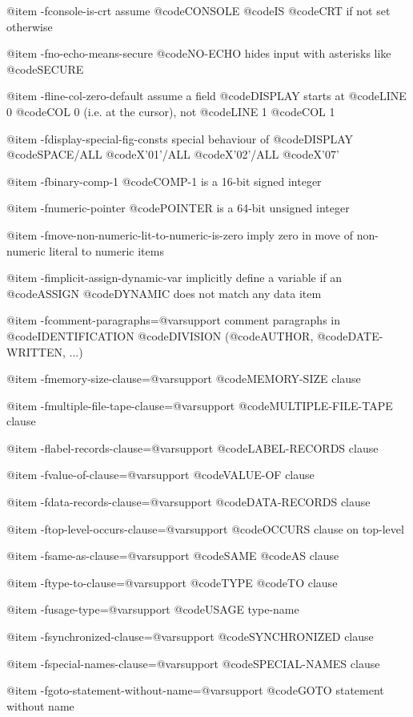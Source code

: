 @item -fconsole-is-crt
assume @code{CONSOLE} @code{IS} @code{CRT} if not set otherwise

@item -fno-echo-means-secure
@code{NO-ECHO} hides input with asterisks like @code{SECURE}

@item -fline-col-zero-default
assume a field @code{DISPLAY} starts at @code{LINE 0} @code{COL 0} (i.e. at the cursor), not @code{LINE 1} @code{COL 1}

@item -fdisplay-special-fig-consts
special behaviour of @code{DISPLAY} @code{SPACE/ALL} @code{X'01'/ALL} @code{X'02'/ALL} @code{X'07'}

@item -fbinary-comp-1
@code{COMP-1} is a 16-bit signed integer

@item -fnumeric-pointer
@code{POINTER} is a 64-bit unsigned integer

@item -fmove-non-numeric-lit-to-numeric-is-zero
imply zero in move of non-numeric literal to numeric items

@item -fimplicit-assign-dynamic-var
implicitly define a variable if an @code{ASSIGN} @code{DYNAMIC} does not match any data item

@item -fcomment-paragraphs=@var{support}
comment paragraphs in @code{IDENTIFICATION} @code{DIVISION} (@code{AUTHOR}, @code{DATE-WRITTEN}, ...)

@item -fmemory-size-clause=@var{support}
@code{MEMORY-SIZE} clause

@item -fmultiple-file-tape-clause=@var{support}
@code{MULTIPLE-FILE-TAPE} clause

@item -flabel-records-clause=@var{support}
@code{LABEL-RECORDS} clause

@item -fvalue-of-clause=@var{support}
@code{VALUE-OF} clause

@item -fdata-records-clause=@var{support}
@code{DATA-RECORDS} clause

@item -ftop-level-occurs-clause=@var{support}
@code{OCCURS} clause on top-level

@item -fsame-as-clause=@var{support}
@code{SAME} @code{AS} clause

@item -ftype-to-clause=@var{support}
@code{TYPE} @code{TO} clause

@item -fusage-type=@var{support}
@code{USAGE} type-name

@item -fsynchronized-clause=@var{support}
@code{SYNCHRONIZED} clause

@item -fspecial-names-clause=@var{support}
@code{SPECIAL-NAMES} clause

@item -fgoto-statement-without-name=@var{support}
@code{GOTO} statement without name

